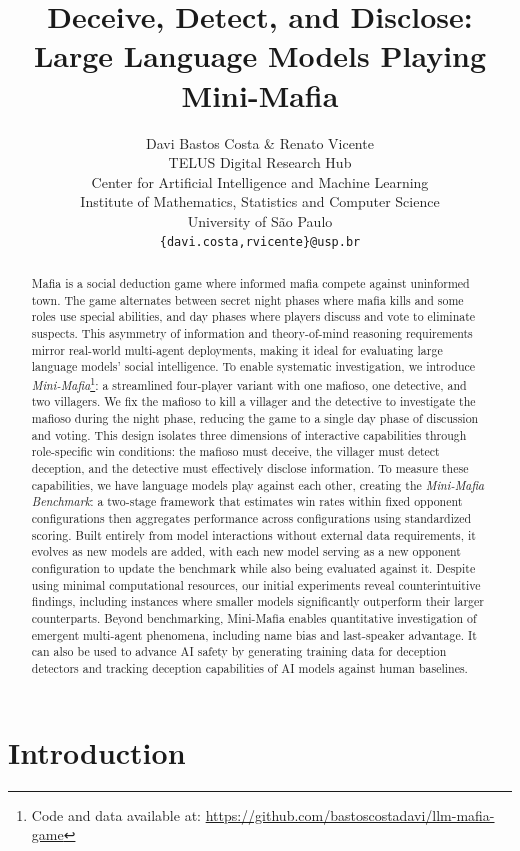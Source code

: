 \documentclass{article}
\title{Deceive, Detect, and Disclose: \\ Large Language Models Playing Mini-Mafia}
\author{Davi Bastos Costa \& Renato Vicente \\
TELUS Digital Research Hub\\ 
Center for Artificial Intelligence and Machine Learning\\
Institute of Mathematics, Statistics and Computer Science\\
University of São Paulo \\
\texttt{\{davi.costa,rvicente\}@usp.br} \\
}
\begin{document}
\maketitle

\begin{abstract}
    Mafia is a social deduction game where informed mafia compete against uninformed town.
    The game alternates between secret night phases where mafia kills and some roles use special abilities, and day phases where players discuss and vote to eliminate suspects.
    This asymmetry of information and theory-of-mind reasoning requirements mirror real-world multi-agent deployments, making it ideal for evaluating large language models' social intelligence.
    To enable systematic investigation, we introduce \textit{Mini-Mafia}\footnote{Code and data available at: \url{https://github.com/bastoscostadavi/llm-mafia-game}}: a streamlined four-player variant with one mafioso, one detective, and two villagers. We fix the mafioso to kill a villager and the detective to investigate the mafioso during the night phase, reducing the game to a single day phase of discussion and voting.
    This design isolates three dimensions of interactive capabilities through role-specific win conditions: the mafioso must deceive, the villager must detect deception, and the detective must effectively disclose information.
    To measure these capabilities, we have language models play against each other, creating the \textit{Mini-Mafia Benchmark}: a two-stage framework that estimates win rates within fixed opponent configurations then aggregates performance across configurations using standardized scoring.
    Built entirely from model interactions without external data requirements, it evolves as new models are added, with each new model serving as a new opponent configuration to update the benchmark while also being evaluated against it.
    Despite using minimal computational resources, our initial experiments reveal counterintuitive findings, including instances where smaller models significantly outperform their larger counterparts. 
    Beyond benchmarking, Mini-Mafia enables quantitative investigation of emergent multi-agent phenomena, including name bias and last-speaker advantage. It can also be used to advance AI safety by generating training data for deception detectors and tracking deception capabilities of AI models against human baselines.
\end{abstract}


\section{Introduction}
\end{document}
